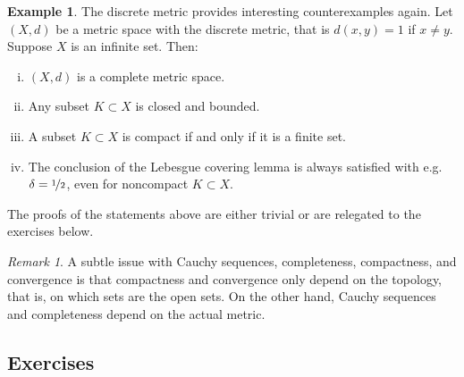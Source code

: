 \documentclass[12pt,openany]{book}
\theoremstyle{plain}
\theoremstyle{remark}
\newtheorem{remark}[thm]{Remark}
\theoremstyle{definition}
\theoremstyle{exercise}
\theoremstyle{example}
\newtheorem{example}[thm]{Example}
\begin{document}
\begin{example}
The discrete metric provides interesting counterexamples again.
Let $(X,d)$ be a metric space with the discrete metric, that is $d(x,y) = 1$
if $x \not= y$.  Suppose
$X$ is an infinite set.  Then:
\begin{enumerate}[(i)]
\item $(X,d)$ is a complete metric space.
\item Any subset $K \subset X$ is closed and bounded.
\item A subset $K \subset X$ is compact if and only if it is a finite set.
\item The conclusion of the Lebesgue covering lemma is always satisfied with
e.g. $\delta = \nicefrac{1}{2}$, even for noncompact $K \subset X$.
\end{enumerate}
The proofs
of the statements above are either trivial or are relegated to the exercises
below.
\end{example}

\begin{remark}
A subtle issue with Cauchy sequences, completeness, compactness,
and convergence is that compactness and convergence only depend on the
topology, that is, on which sets are the open sets.  On the other hand,
Cauchy sequences and completeness depend on the actual metric.
\end{remark}

\subsection{Exercises}
\end{document}
